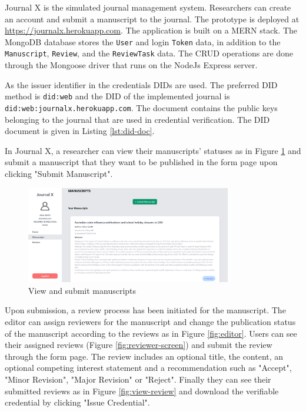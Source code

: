 Journal X is the simulated journal management system. Researchers can create an account and submit a manuscript to the journal. The prototype is deployed at \url{https://journalx.herokuapp.com}. The application is built on a \acrshort{MERN} stack. The MongoDB database stores the \lstinline{User} and login \lstinline{Token} data, in addition to the \lstinline{Manuscript}, \lstinline{Review}, and the \lstinline{ReviewTask} data. The \acrshort{CRUD} operations are done through the Mongoose driver that runs on the NodeJs Express server.

As the issuer identifier in the credentials \acrshort{DID}s are used. The preferred \acrshort{DID} method is \lstinline{did:web} and the \acrshort{DID} of the implemented journal is \lstinline{did:web:journalx.herokuapp.com}. The document contains the public keys belonging to the journal that are used in credential verification. The \acrshort{DID} document is given in Listing \ref{lst:did-doc}.



In Journal X, a researcher can view their manuscripts' statuses as in Figure  \ref{fig:submit-manuscript} and submit a manuscript that they want to be published in the form page upon clicking "Submit Manuscript". 

\begin{figure}[htpb]
  \centering
  \includegraphics[width=0.8\textwidth]{figures/submitManuscript.png}
  \caption{View and submit manuscripts} \label{fig:submit-manuscript}
\end{figure}

Upon submission, a review process has been initiated for the manuscript. The editor can assign reviewers for the manuscript and change the publication status of the manuscript according to the reviews as in Figure \ref{fig:editor}. Users can see their assigned reviews (Figure \ref{fig:reviewer-screen}) and submit the review through the form page. The review includes an optional title, the content, an optional competing interest statement and a recommendation such as "Accept", "Minor Revision", "Major Revision" or "Reject". Finally they can see their submitted reviews as in Figure \ref{fig:view-review} and download the verifiable credential by clicking "Issue Credential".

